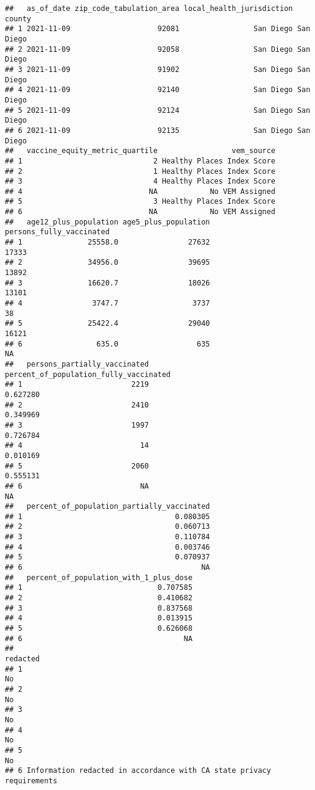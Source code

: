 \documentclass[
]{article}
\begin{document}
\begin{verbatim}
##   as_of_date zip_code_tabulation_area local_health_jurisdiction    county
## 1 2021-11-09                    92081                 San Diego San Diego
## 2 2021-11-09                    92058                 San Diego San Diego
## 3 2021-11-09                    91902                 San Diego San Diego
## 4 2021-11-09                    92140                 San Diego San Diego
## 5 2021-11-09                    92124                 San Diego San Diego
## 6 2021-11-09                    92135                 San Diego San Diego
##   vaccine_equity_metric_quartile                 vem_source
## 1                              2 Healthy Places Index Score
## 2                              1 Healthy Places Index Score
## 3                              4 Healthy Places Index Score
## 4                             NA            No VEM Assigned
## 5                              3 Healthy Places Index Score
## 6                             NA            No VEM Assigned
##   age12_plus_population age5_plus_population persons_fully_vaccinated
## 1               25558.0                27632                    17333
## 2               34956.0                39695                    13892
## 3               16620.7                18026                    13101
## 4                3747.7                 3737                       38
## 5               25422.4                29040                    16121
## 6                 635.0                  635                       NA
##   persons_partially_vaccinated percent_of_population_fully_vaccinated
## 1                         2219                               0.627280
## 2                         2410                               0.349969
## 3                         1997                               0.726784
## 4                           14                               0.010169
## 5                         2060                               0.555131
## 6                           NA                                     NA
##   percent_of_population_partially_vaccinated
## 1                                   0.080305
## 2                                   0.060713
## 3                                   0.110784
## 4                                   0.003746
## 5                                   0.070937
## 6                                         NA
##   percent_of_population_with_1_plus_dose
## 1                               0.707585
## 2                               0.410682
## 3                               0.837568
## 4                               0.013915
## 5                               0.626068
## 6                                     NA
##                                                                redacted
## 1                                                                    No
## 2                                                                    No
## 3                                                                    No
## 4                                                                    No
## 5                                                                    No
## 6 Information redacted in accordance with CA state privacy requirements
\end{verbatim}
\end{document}

